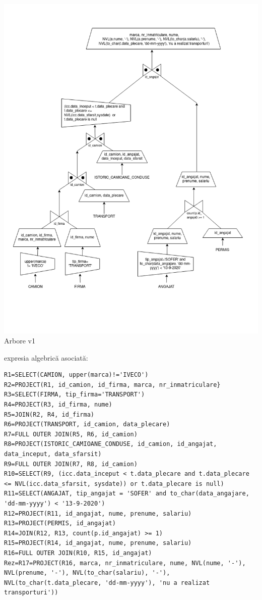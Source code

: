\documentclass[12pt, a4paper]{article}
\begin{document}
\includegraphics[width=\textwidth]{arbore_v1.png}
\label{arbore_v1}
\centering Arbore v1

\newpage{} expresia algebrică asociată:

\begin{lstlisting}
R1=SELECT(CAMION, upper(marca)!='IVECO')
R2=PROJECT(R1, id_camion, id_firma, marca, nr_inmatriculare}
R3=SELECT(FIRMA, tip_firma='TRANSPORT')
R4=PROJECT(R3, id_firma, nume)
R5=JOIN(R2, R4, id_firma)
R6=PROJECT(TRANSPORT, id_camion, data_plecare)
R7=FULL OUTER JOIN(R5, R6, id_camion)
R8=PROJECT(ISTORIC_CAMIOANE_CONDUSE, id_camion, id_angajat, data_inceput, data_sfarsit)
R9=FULL OUTER JOIN(R7, R8, id_camion)
R10=SELECT(R9, (icc.data_inceput < t.data_plecare and t.data_plecare <= NVL(icc.data_sfarsit, sysdate)) or t.data_plecare is null)
R11=SELECT(ANGAJAT, tip_angajat = 'SOFER' and to_char(data_angajare, 'dd-mm-yyyy') < '13-9-2020')
R12=PROJECT(R11, id_angajat, nume, prenume, salariu)
R13=PROJECT(PERMIS, id_angajat)
R14=JOIN(R12, R13, count(p.id_angajat) >= 1)
R15=PROJECT(R14, id_angajat, nume, prenume, salariu)
R16=FULL OUTER JOIN(R10, R15, id_angajat)
Rez=R17=PROJECT(R16, marca, nr_inmatriculare, nume, NVL(nume, '-'), NVL(prenume, '-'), NVL(to_char(salariu), '-'), NVL(to_char(t.data_plecare, 'dd-mm-yyyy'), 'nu a realizat transporturi'))
\end{lstlisting}
\end{document}
